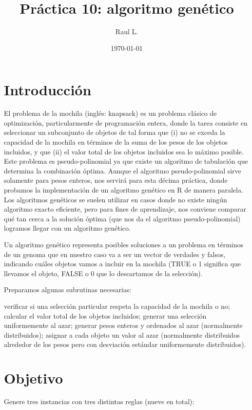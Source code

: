 \documentclass{article}
\author{Raul L.} %
\title{Pr\'{a}ctica 10: algoritmo genético} %
\date{\today}
\begin{document}

\maketitle %


\section{Introducci\'{o}n}\label{intro} %
El problema de la mochila (inglés: knapsack) es un problema clásico de optimización, particularmente de programación entera, donde la tarea consiste en seleccionar un subconjunto de objetos de tal forma que (i) no se exceda la capacidad de la mochila en términos de la suma de los pesos de los objetos incluidos, y que (ii) el valor total de los objetos incluidos sea lo máximo posible. Este problema es pseudo-polinomial ya que existe un algoritmo de tabulación que determina la combinación óptima.
Aunque el algoritmo pseudo-polinomial sirve solamente para pesos enteros, nos servirá para esta décima práctica, donde probamos la implementación de un algoritmo genético en R de manera paralela. Los algoritmos genéticos se suelen utilizar en casos donde no existe ningún algoritmo exacto eficiente, pero para fines de aprendizaje, nos conviene comparar qué tan cerca a la solución óptima (que nos da el algoritmo pseudo-polinomial) logramos llegar con un algoritmo genético.

Un algoritmo genético representa posibles soluciones a un problema en términos de un genoma que en nuestro caso va a ser un vector de verdades y falsos, indicando cuáles objetos vamos a incluir en la mochila (TRUE o 1 significa que llevamos el objeto, FALSE o 0 que lo descartamos de la selección).

Preparamos algunas subrutinas necesarias:

verificar si una selección particular respeta la capacidad de la mochila o no;
calcular el valor total de los objetos incluidos;
generar una selección uniformemente al azar;
generar pesos enteros y ordenados al azar (normalmente distribuidos);
asignar a cada objeto un valor al azar (normalmente distribuidos alrededor de los pesos pero con desviación estándar uniformemente distribuidos)\citep{2}.


\section{Objetivo}
Genere tres instancias con tres distintas reglas (nueve en total):
\end{document}
